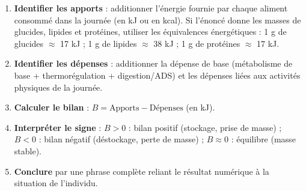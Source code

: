 \documentclass[11pt]{article}
\begin{document}
\begin{methode}
\begin{enumerate}
\item \textbf{Identifier les apports} : additionner l'\'energie fournie par chaque aliment consommé dans la journ\'ee (en kJ ou en kcal). Si l'\'enonc\'e donne les masses de glucides, lipides et prot\'eines, utiliser les \'equivalences \'energ\'etiques : 1 g de glucides $\approx$ 17 kJ ; 1 g de lipides $\approx$ 38 kJ ; 1 g de prot\'eines $\approx$ 17 kJ.
\item \textbf{Identifier les d\'epenses} : additionner la d\'epense de base (m\'etabolisme de base + thermor\'egulation + digestion/ADS) et les d\'epenses li\'ees aux activit\'es physiques de la journ\'ee.
\item \textbf{Calculer le bilan} : $B = \text{Apports} - \text{D\'epenses}$ (en kJ).
\item \textbf{Interpr\'eter le signe} : $B > 0$ : bilan positif (stockage, prise de masse) ; $B < 0$ : bilan n\'egatif (d\'estockage, perte de masse) ; $B \approx 0$ : \'equilibre (masse stable).
\item \textbf{Conclure} par une phrase compl\`ete reliant le r\'esultat num\'erique \`a la situation de l'individu.
\end{enumerate}
\end{methode}
\end{document}
